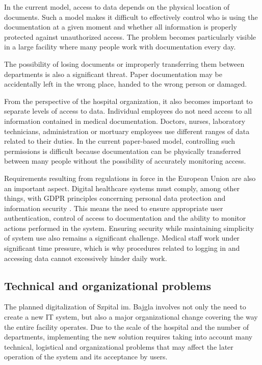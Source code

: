 In the current model, access to data depends on the physical location of documents. Such a model makes it difficult to effectively control who is using the documentation at a given moment and whether all information is properly protected against unauthorized access. The problem becomes particularly visible in a large facility where many people work with documentation every day.

The possibility of losing documents or improperly transferring them between departments is also a significant threat. Paper documentation may be accidentally left in the wrong place, handed to the wrong person or damaged.

From the perspective of the hospital organization, it also becomes important to separate levels of access to data. Individual employees do not need access to all information contained in medical documentation. Doctors, nurses, laboratory technicians, administration or mortuary employees use different ranges of data related to their duties. In the current paper-based model, controlling such permissions is difficult because documentation can be physically transferred between many people without the possibility of accurately monitoring access.

Requirements resulting from regulations in force in the European Union are also an important aspect. Digital healthcare systems must comply, among other things, with GDPR principles concerning personal data protection and information security \cite{EU_eHealth_2024}. This means the need to ensure appropriate user authentication, control of access to documentation and the ability to monitor actions performed in the system.
Ensuring security while maintaining simplicity of system use also remains a significant challenge. Medical staff work under significant time pressure, which is why procedures related to logging in and accessing data cannot excessively hinder daily work.
\subsection{Technical and organizational problems}
The planned digitalization of Szpital im. Bajgla involves not only the need to create a new IT system, but also a major organizational change covering the way the entire facility operates. Due to the scale of the hospital and the number of departments, implementing the new solution requires taking into account many technical, logistical and organizational problems that may affect the later operation of the system and its acceptance by users.


